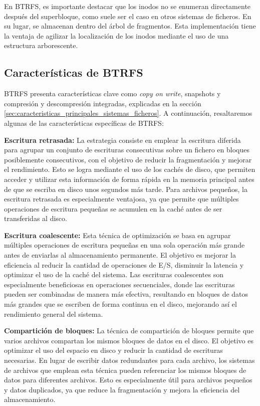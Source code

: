 En BTRFS, es importante destacar que los inodos no se enumeran directamente después del superbloque, como suele ser el caso en otros sistemas de ficheros. En su lugar, se almacenan dentro del árbol de fragmentos. Esta implementación tiene la ventaja de agilizar la localización de los inodos mediante el uso de una estructura arborescente.

\subsection{Características de BTRFS}

BTRFS presenta características clave como \textit{copy on write}, snapshots y compresión y descompresión integradas, explicadas en la sección \ref{sec:caracteristicas_principales_sistemas_ficheros}. A continuación, resaltaremos algunas de las características específicas de BTRFS:

\textbf{Escritura retrasada:} La estrategia consiste en emplear la escritura diferida para agrupar un conjunto de escrituras consecutivas sobre un fichero en bloques posiblemente consecutivos, con el objetivo de reducir la fragmentación y mejorar el rendimiento. Esto se logra mediante el uso de los cachés de disco, que permiten acceder y utilizar esta información de forma rápida en la memoria principal antes de que se escriba en disco unos segundos más tarde. Para archivos pequeños, la escritura retrasada es especialmente ventajosa, ya que permite que múltiples operaciones de escritura pequeñas se acumulen en la caché antes de ser transferidas al disco.\newline

\textbf{Escritura coalescente:} Esta técnica de optimización se basa en agrupar múltiples operaciones de escritura pequeñas en una sola operación más grande antes de enviarlas al almacenamiento permanente. El objetivo es mejorar la eficiencia al reducir la cantidad de operaciones de E/S, disminuir la latencia y optimizar el uso de la caché del sistema. Las escrituras coalescentes son especialmente beneficiosas en operaciones secuenciales, donde las escrituras pueden ser combinadas de manera más efectiva, resultando en bloques de datos más grandes que se escriben de forma continua en el disco, mejorando así el rendimiento general del sistema.\newline

\textbf{Compartición de bloques:} La técnica de compartición de bloques permite que varios archivos compartan los mismos bloques de datos en el disco. El objetivo es optimizar el uso del espacio en disco y reducir la cantidad de escrituras necesarias. En lugar de escribir datos redundantes para cada archivo, los sistemas de archivos que emplean esta técnica pueden referenciar los mismos bloques de datos para diferentes archivos. Esto es especialmente útil para archivos pequeños y datos duplicados, ya que reduce la fragmentación y mejora la eficiencia del almacenamiento.\newline


